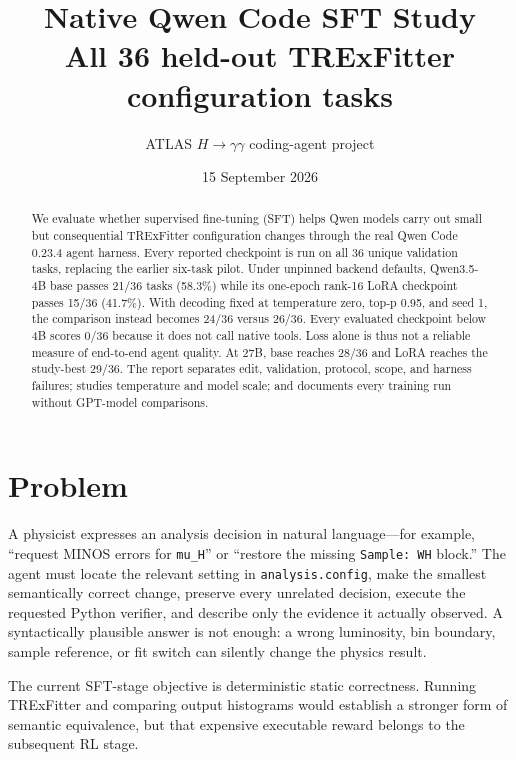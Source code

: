 \documentclass[10pt]{article}
\title{Native Qwen Code SFT Study\\\large All 36 held-out TRExFitter configuration tasks}
\author{ATLAS $H\rightarrow\gamma\gamma$ coding-agent project}
\date{15 September 2026}
\newcommand{\code}[1]{\texttt{#1}}
\begin{document}
\maketitle

\begin{abstract}
We evaluate whether supervised fine-tuning (SFT) helps Qwen models carry out
small but consequential TRExFitter configuration changes through the real Qwen
Code 0.23.4 agent harness.  Every reported checkpoint is run on all 36 unique
validation tasks, replacing the earlier six-task pilot.  Under unpinned backend
defaults, Qwen3.5-4B base passes 21/36 tasks (58.3\%) while its one-epoch
rank-16 LoRA checkpoint passes 15/36 (41.7\%).  With decoding fixed at
temperature zero, top-p 0.95, and seed 1, the comparison instead becomes
24/36 versus 26/36.  Every evaluated
checkpoint below 4B scores 0/36 because it does not call native tools.  Loss alone is thus
not a reliable measure of end-to-end agent quality.  At 27B, base reaches
28/36 and LoRA reaches the study-best 29/36.  The report separates edit,
validation, protocol, scope, and harness failures; studies temperature and
model scale; and documents every training run without GPT-model comparisons.
\end{abstract}

\section{Problem}
A physicist expresses an analysis decision in natural language---for example,
``request MINOS errors for \code{mu\_H}'' or ``restore the missing \code{Sample:
WH} block.''  The agent must locate the relevant setting in
\code{analysis.config}, make the smallest semantically correct change, preserve
every unrelated decision, execute the requested Python verifier, and describe
only the evidence it actually observed.  A syntactically plausible answer is
not enough: a wrong luminosity, bin boundary, sample reference, or fit switch
can silently change the physics result.

The current SFT-stage objective is deterministic static correctness.  Running
TRExFitter and comparing output histograms would establish a stronger form of
semantic equivalence, but that expensive executable reward belongs to the
subsequent RL stage.
\end{document}

